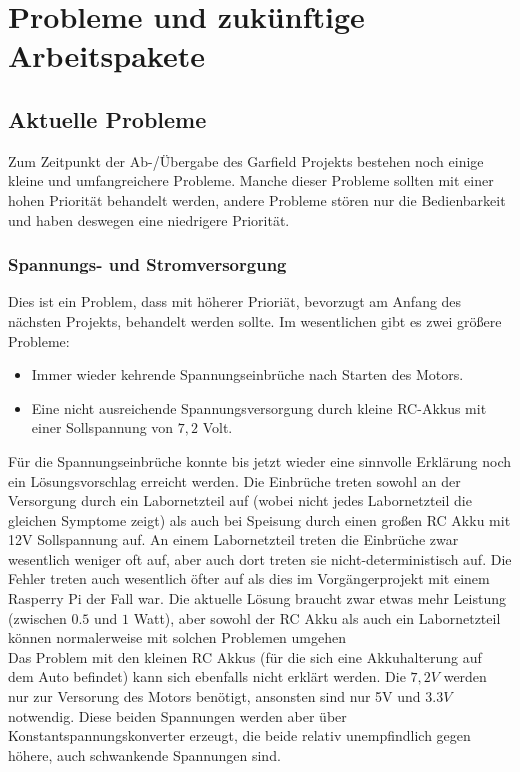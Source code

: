 \chapter{Probleme und zukünftige Arbeitspakete}

\section{Aktuelle Probleme}
Zum Zeitpunkt der Ab-/Übergabe des Garfield Projekts bestehen noch einige kleine und umfangreichere Probleme. Manche dieser Probleme sollten mit einer hohen Priorität behandelt werden, andere Probleme stören nur die Bedienbarkeit und haben deswegen eine niedrigere Priorität.

\subsection{Spannungs- und Stromversorgung}
\label{Problem:Spannung}
Dies ist ein Problem, dass mit höherer Prioriät, bevorzugt am Anfang des nächsten Projekts, behandelt werden sollte. Im wesentlichen gibt es zwei größere Probleme:
\begin{itemize}
	\item Immer wieder kehrende Spannungseinbrüche nach Starten des Motors. 
	\item Eine nicht ausreichende Spannungsversorgung durch kleine RC-Akkus mit einer Sollspannung von $7,2$ Volt.
\end{itemize}

Für die Spannungseinbrüche konnte bis jetzt wieder eine sinnvolle Erklärung noch ein Lösungsvorschlag erreicht werden. Die Einbrüche treten sowohl an der Versorgung durch ein Labornetzteil auf (wobei nicht jedes Labornetzteil die gleichen Symptome zeigt) als auch bei Speisung durch einen großen RC Akku mit 12V Sollspannung auf. An einem Labornetzteil treten die Einbrüche zwar wesentlich weniger oft auf, aber auch dort treten sie nicht-deterministisch auf. Die Fehler treten auch wesentlich öfter auf als dies im Vorgängerprojekt mit einem Rasperry Pi der Fall war. Die aktuelle Lösung braucht zwar etwas mehr Leistung (zwischen $0.5$ und $1$ Watt), aber sowohl der RC Akku als auch ein Labornetzteil können normalerweise mit solchen Problemen umgehen\\

Das Problem mit den kleinen RC Akkus (für die sich eine Akkuhalterung auf dem Auto befindet) kann sich ebenfalls nicht erklärt werden. Die $7,2V$ werden nur zur Versorung des Motors benötigt, ansonsten sind nur 5V und $3.3V$ notwendig. Diese beiden Spannungen werden aber über Konstantspannungskonverter erzeugt, die beide relativ unempfindlich gegen höhere, auch schwankende Spannungen sind.\\

